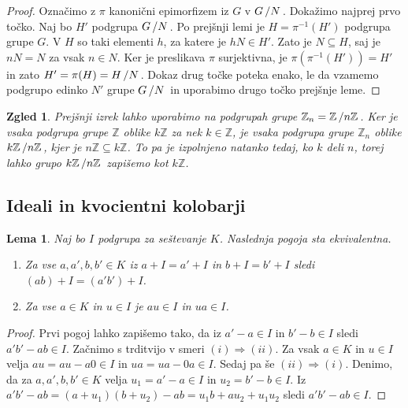 \documentclass[10pt, a4paper]{article}
\newtheorem{zgled}{Zgled}[section]
\newtheorem{lema}[izr]{Lema}
\newenvironment{noticeC}{%
  \tcolorbox[%
  notitle,
  empty,
  enhanced,  %
  breakable,
  coltext=black, 
  fontupper=\rmfamily,
  parbox=false,
  noparskip,
  sharp corners,
  boxrule=-1pt,  %
  frame hidden,
  left=7pt,  %
  right=7pt,
  top=5pt,
  bottom=5pt,
  before skip=2.5ex plus 2pt,
  after skip=2.5ex plus 2pt,
  overlay unbroken and last={%
  },
  ]}
{\endtcolorbox}
\newenvironment{dokaz}%
  {\begin{noticeC}\begin{proof}}%
  {\end{proof}\end{noticeC}}
\newcommand{\Z}{\mathbb {Z}}
\newcommand{\quot}[2]{{\raisebox{0em}{$#1$}\left/\raisebox{0em}{$#2$}\right.}}
\begin{document}
\begin{dokaz}
  Označimo z $\pi$ kanonični epimorfizem iz $G$ v $\quot{G}{N}$.
  Dokažimo najprej prvo točko. Naj bo $H'$ podgrupa $\quot{G}{N}$.
  Po prejšnji lemi je $H = \pi^{-1} (H')$ podgrupa grupe $G$.
  V $H$ so taki elementi $h$, za katere je $hN \in H'$. Zato je $N \subseteq H$,
  saj je $n N = N$ za vsak $n \in N$. Ker je preslikava $\pi$ surjektivna, 
  je $\pi (\pi^{-1} (H')) = H'$ in zato $H' = \pi (H) = \quot{H}{N}$.
  Dokaz drug točke poteka enako, le da vzamemo podgrupo edinko $N'$ grupe $\quot{G}{N}$
  in uporabimo drugo točko prejšnje leme. 
\end{dokaz}

\begin{zgled}
  Prejšnji izrek lahko uporabimo na podgrupah grupe $\Z_n = \quot{\Z}{n\Z}$.
  Ker je vsaka podgrupa grupe $\Z$ oblike $k\Z$ za nek $k \in \Z$, 
  je vsaka podgrupa grupe $\Z_n$ oblike $\quot{k\Z}{n\Z}$, kjer je $n\Z \subseteq k \Z$.
  To pa je izpolnjeno natanko tedaj, ko $k$ deli $n$, torej lahko grupo $\quot{k\Z}{n\Z}$
  zapišemo kot $k\Z$.
\end{zgled}

\subsection{Ideali in kvocientni kolobarji}

\begin{lema}
  Naj bo $I$ podgrupa za seštevanje $K$. Naslednja pogoja sta ekvivalentna.
  \begin{enumerate}
    \item Za vse $a, a', b, b' \in K$ iz $a + I = a' + I$ in $b + I = b' + I$ sledi $(ab) + I = (a' b') + I$.
    \item Za vse $a \in K$ in $u \in I$ je $au \in I$ in $ua \in I$.
  \end{enumerate}
\end{lema}

\begin{dokaz}
  Prvi pogoj lahko zapišemo tako, da iz $a' - a \in I$ in $b' - b \in I$ sledi $a'b' - ab \in I$.
  Začnimo s trditvijo v smeri $(i) \Rightarrow (ii)$. Za vsak $a \in K$ in $u \in I$
  velja $au = au - a0 \in I$ in $ua = ua - 0a \in I$.
  Sedaj pa še $(ii) \Rightarrow (i)$. Denimo, da za $a, a', b, b' \in K$ velja $u_1 = a' - a \in I$
  in $u_2 = b' - b \in I$. Iz $a'b' - ab = (a + u_1) (b + u_2) - ab = u_1 b + a u_2 + u_1 u_2$
  sledi $a'b' - ab \in I$.
\end{dokaz}
\end{document}
